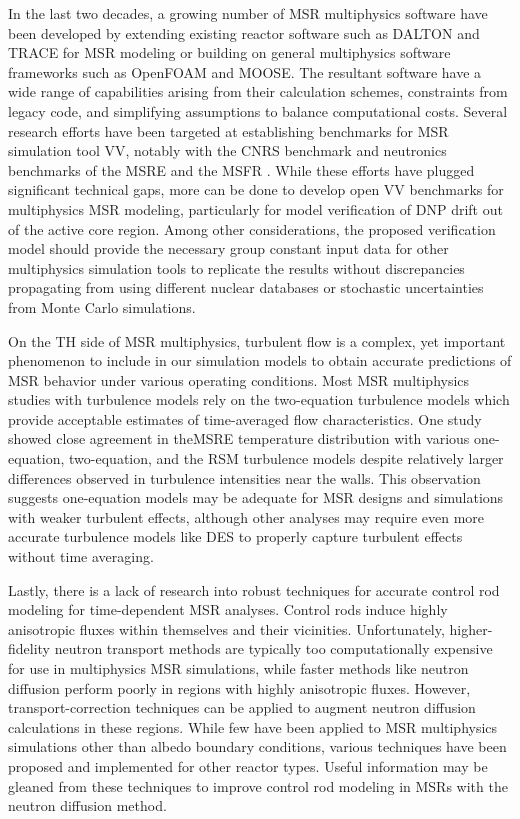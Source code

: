 In the last two decades, a growing number of \gls{MSR} multiphysics software have been developed by
extending existing reactor software such as DALTON and \gls{TRACE} for \gls{MSR} modeling or
building on general multiphysics software frameworks such as OpenFOAM and \gls{MOOSE}. The
resultant software have a wide range of capabilities arising from their calculation schemes,
constraints from legacy code, and simplifying assumptions to balance computational costs. Several
research efforts have been targeted at establishing benchmarks for \gls{MSR} simulation tool
\gls{VV}, notably with the CNRS benchmark \cite{tiberga_results_2020} and neutronics benchmarks of
the \gls{MSRE} \cite{fratoni_molten_2020} and the \gls{MSFR} \cite{brovchenko_neutronic_2019}.
While these efforts have plugged significant technical gaps, more can be done to develop open
\gls{VV} benchmarks for multiphysics \gls{MSR} modeling, particularly for model verification of
\gls{DNP} drift out of the active core region. Among other considerations, the proposed
verification model should provide the necessary group constant input data for other multiphysics
simulation tools to replicate the results without discrepancies propagating from using different
nuclear databases or stochastic uncertainties from Monte Carlo simulations.

On the \gls{TH} side of \gls{MSR} multiphysics, turbulent flow is a complex, yet important
phenomenon to include in our simulation models to obtain accurate predictions of \gls{MSR} behavior
under various operating conditions. Most \gls{MSR} multiphysics studies with turbulence models rely
on the two-equation turbulence models which provide acceptable estimates of time-averaged flow
characteristics. One study \cite{podila_cfd_2019} showed close agreement in the\gls{MSRE}
temperature distribution with various one-equation, two-equation, and the \gls{RSM} turbulence
models despite relatively larger differences observed in turbulence intensities near the walls.
This observation suggests one-equation models may be adequate for \gls{MSR} designs and simulations
with weaker turbulent effects, although other analyses may require even more accurate turbulence
models like \gls{DES} to properly capture turbulent effects without time averaging.

Lastly, there is a lack of research into robust techniques for accurate control rod modeling for
time-dependent \gls{MSR} analyses. Control rods induce highly anisotropic fluxes within themselves
and their vicinities.
Unfortunately, higher-fidelity neutron transport methods are typically too computationally
expensive for use in multiphysics \gls{MSR} simulations, while faster methods like neutron
diffusion perform poorly in regions with highly anisotropic fluxes. However, transport-correction
techniques can be applied to augment neutron diffusion calculations in these regions. While few
have been applied to \gls{MSR} multiphysics simulations other than albedo boundary conditions,
various techniques have been proposed and implemented for other reactor types. Useful information
may be gleaned from these techniques to improve control rod modeling in \glspl{MSR} with the
neutron diffusion method.
